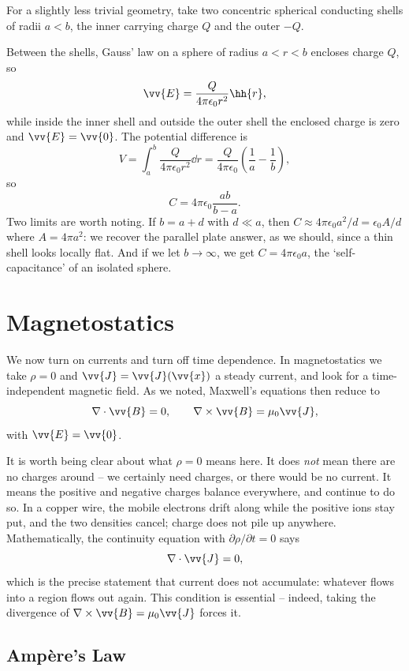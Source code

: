 \begin{example}
	For a slightly less trivial geometry, take two concentric spherical conducting shells of radii $a < b$, the inner carrying charge $Q$ and the outer $-Q$.

	Between the shells, Gauss' law on a sphere of radius $a < r < b$ encloses charge $Q$, so
	$$
	\vv{E} = \frac{Q}{4\pi\epsilon_0 r^2}\hh{r},
	$$
	while inside the inner shell and outside the outer shell the enclosed charge is zero and $\vv{E} = \vv{0}$. The potential difference is
	$$
	V = \int_a^b \frac{Q}{4\pi \epsilon_0 r^2}\dd r = \frac{Q}{4\pi\epsilon_0}\left(\frac{1}{a}-\frac{1}{b}\right),
	$$
	so
	$$
	C = 4\pi \epsilon_0 \frac{ab}{b-a}.
	$$
	Two limits are worth noting. If $b = a + d$ with $d \ll a$, then $C \approx 4\pi\epsilon_0 a^2/d = \epsilon_0 A/d$ where $A = 4\pi a^2$: we recover the parallel plate answer, as we should, since a thin shell looks locally flat. And if we let $b\to\infty$, we get $C = 4\pi\epsilon_0 a$, the `self-capacitance' of an isolated sphere.
\end{example}

\section{Magnetostatics}

We now turn on currents and turn off time dependence. In magnetostatics we take $\rho = 0$ and $\vv{J} = \vv{J}(\vv{x})$ a steady current, and look for a time-independent magnetic field. As we noted, Maxwell's equations then reduce to
$$
\nabla \cdot \vv{B} = 0, \qquad \nabla \times \vv{B} = \mu_0 \vv{J},
$$
with $\vv{E} = \vv{0}$.

It is worth being clear about what $\rho = 0$ means here. It does \emph{not} mean there are no charges around -- we certainly need charges, or there would be no current. It means the positive and negative charges balance everywhere, and continue to do so. In a copper wire, the mobile electrons drift along while the positive ions stay put, and the two densities cancel; charge does not pile up anywhere. Mathematically, the continuity equation with $\partial \rho/\partial t = 0$ says
$$
\nabla \cdot \vv{J} = 0,
$$
which is the precise statement that current does not accumulate: whatever flows into a region flows out again. This condition is essential -- indeed, taking the divergence of $\nabla\times \vv{B} = \mu_0 \vv{J}$ forces it.

\subsection{Amp\`ere's Law}

